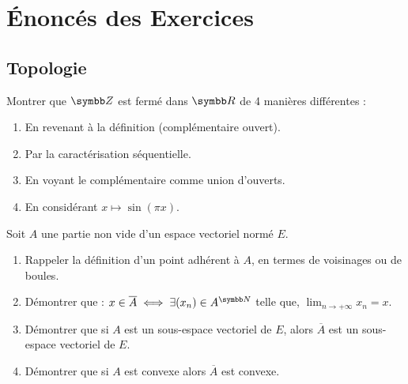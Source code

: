 \section{Énoncés des Exercices}
\subsection{Topologie}

\begin{exercice}
    Montrer que $\Z$ est fermé dans $\R$ de 4 manières différentes :
    \begin{enumerate}
        \item En revenant à la définition (complémentaire ouvert).
        \item Par la caractérisation séquentielle.
        \item En voyant le complémentaire comme union d'ouverts.
        \item En considérant $x \mapsto \sin(\pi x)$.
    \end{enumerate}
\end{exercice}

\begin{exercice}
    Soit $A$ une partie non vide d'un espace vectoriel normé $E$.
    \begin{enumerate}
        \item Rappeler la définition d'un point adhérent à $A$, en termes de voisinages ou de boules.
        \item Démontrer que : $x \in \overline A \iff \exists (x_n) \in A^{\N}$ telle que, 
        $\lim_{n \rightarrow +\infty} x_n = x$.
        \item Démontrer que si $A$ est un sous-espace vectoriel de $E$, alors $\overline A$ est un sous-espace vectoriel de $E$.
        \item Démontrer que si $A$ est convexe alors $\overline A$ est convexe.
    \end{enumerate}
\end{exercice}

